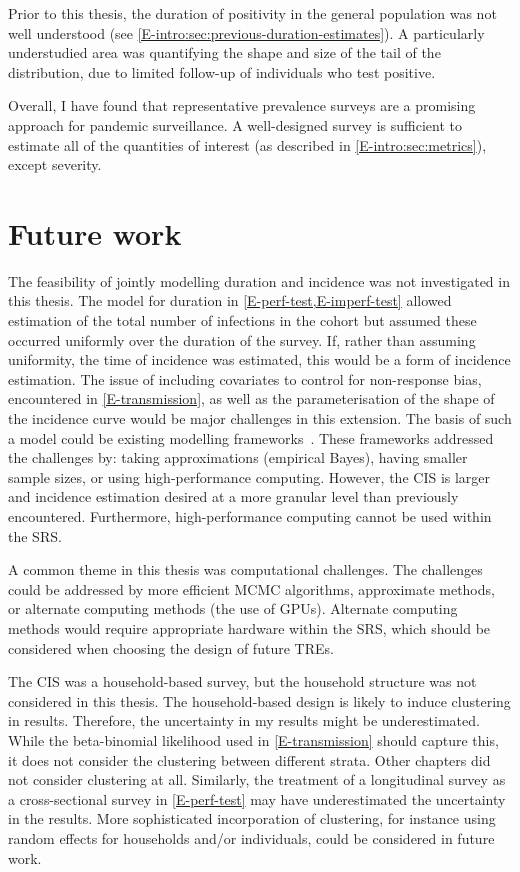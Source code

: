 \documentclass[thesis.tex]{subfiles}
\begin{document}
Prior to this thesis, the duration of positivity in the general population was not well understood (see \cref{E-intro:sec:previous-duration-estimates}).
A particularly understudied area was quantifying the shape and size of the tail of the distribution, due to limited follow-up of individuals who test positive.

Overall, I have found that representative prevalence surveys are a promising approach for pandemic surveillance.
A well-designed survey is sufficient to estimate all of the quantities of interest (as described in \cref{E-intro:sec:metrics}), except severity.


\section{Future work} \label{conclusion:sec:future-work}

The feasibility of jointly modelling duration and incidence was not investigated in this thesis.
The model for duration in \cref{E-perf-test,E-imperf-test} allowed estimation of the total number of infections in the cohort but assumed these occurred uniformly over the duration of the survey.
If, rather than assuming uniformity, the time of incidence was estimated, this would be a form of incidence estimation.
The issue of including covariates to control for non-response bias, encountered in \cref{E-transmission}, as well as the parameterisation of the shape of the incidence curve would be major challenges in this extension.
The basis of such a model could be existing modelling frameworks~\autocite[e.g.][]{taffeJoint,haySerosolver}.
These frameworks addressed the challenges by: taking approximations (\eg empirical Bayes), having smaller sample sizes, or using high-performance computing.
However, the CIS is larger and incidence estimation desired at a more granular level than previously encountered.
Furthermore, high-performance computing cannot be used within the SRS.

A common theme in this thesis was computational challenges.
The challenges could be addressed by more efficient MCMC algorithms, approximate methods, or alternate computing methods (\eg the use of GPUs).
Alternate computing methods would require appropriate hardware within the SRS, which should be considered when choosing the design of future TREs.

The CIS was a household-based survey, but the household structure was not considered in this thesis.
The household-based design is likely to induce clustering in results.
Therefore, the uncertainty in my results might be underestimated.
While the beta-binomial likelihood used in \cref{E-transmission} should capture this, it does not consider the clustering between different strata.
Other chapters did not consider clustering at all.
Similarly, the treatment of a longitudinal survey as a cross-sectional survey in \cref{E-perf-test} may have underestimated the uncertainty in the results.
More sophisticated incorporation of clustering, for instance using random effects for households and/or individuals, could be considered in future work.
\end{document}
